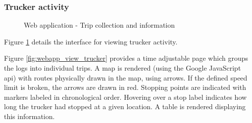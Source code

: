 \subsubsection{Trucker activity}
\begin{figure}
\centering
\caption{Web application - Trip collection and information}
\label{fig:webapp_trucker_details}
\end{figure}
Figure \ref{fig:webapp_trucker_details} details the interface for viewing trucker activity.

Figure \ref{fig:webapp_view_trucker} provides a time adjustable page which groups the logs into individual trips.
A map is rendered (using the Google JavaScript \Ac{api}) with routes physically drawn in the map, using arrows.
If the defined speed limit is broken, the arrows are drawn in red.
Stopping points are indicated with markers labeled in chronological order.
Hovering over a stop label indicates how long the trucker had stopped at a given location.
A table is rendered displaying this information.


